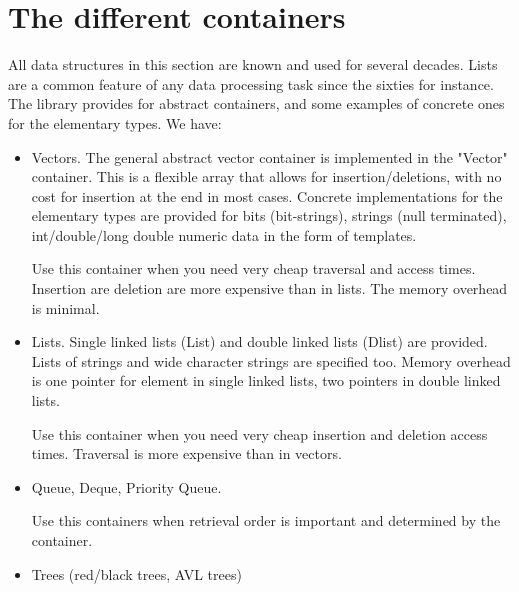 \documentclass[12pt,a4paper]{memoir} %
\begin{document}
\section{The different containers}
All data structures in this section are known and used for several decades. Lists are a common feature of any data processing task since the sixties for instance. 
The library provides for abstract containers, and some examples of concrete ones for the elementary types.
We have:
\begin{itemize}
\item
Vectors. The general abstract vector container is implemented in the "Vector" container. This is a flexible array that allows for insertion/deletions, 
with no cost for insertion at the end in most cases. Concrete implementations for the elementary types are provided for bits (bit-strings), strings 
(null terminated), int/double/long double numeric data in the form of templates.

Use this container when you need very cheap traversal and access times. Insertion are deletion are more expensive than in lists. The memory overhead is minimal.

\item
Lists. Single linked lists (List) and double linked lists (Dlist) are provided. Lists of strings and wide character strings are specified too. Memory overhead is one pointer for element in single linked lists, two pointers in double linked lists.

Use this container when you need very cheap insertion and deletion access times. Traversal is more expensive than in vectors.
\item
Queue, Deque, Priority Queue.

Use this containers when retrieval order is important and determined by the container.
\item
Trees (red/black trees, AVL trees)


\end{itemize}
\end{document}
